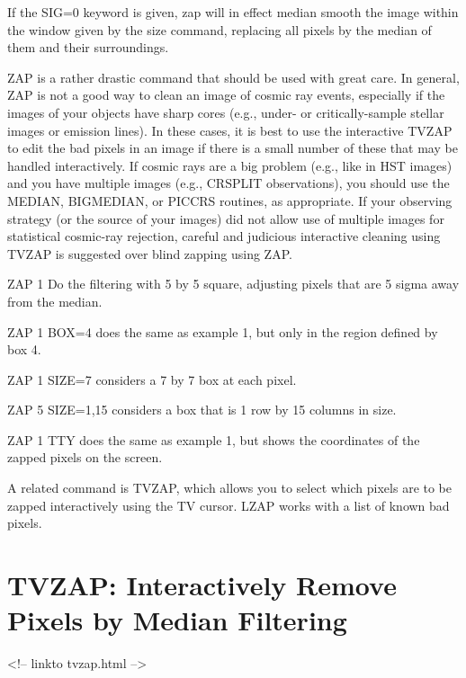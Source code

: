 If the SIG=0 keyword is given, zap will in effect median smooth the image
within the window given by the size command, replacing all pixels by the
median of them and their surroundings.

ZAP is a rather drastic command that should be used with great care.  In
general, ZAP is not a good way to clean an image of cosmic ray events,
especially if the images of your objects have sharp cores (e.g., under- or
critically-sample stellar images or emission lines).  In these cases, it is
best to use the interactive TVZAP to edit the bad pixels in an image if
there is a small number of these that may be handled interactively.  If
cosmic rays are a big problem (e.g., like in HST images) and you have
multiple images (e.g., CRSPLIT observations), you should use the MEDIAN,
BIGMEDIAN, or PICCRS routines, as appropriate.  If your observing strategy
(or the source of your images) did not allow use of multiple images for
statistical cosmic-ray rejection, careful and judicious interactive
cleaning using TVZAP is suggested over blind zapping using ZAP.

\begin{example}
  \item[ZAP 1\hfill]{Do the filtering with 5 by 5 square,
       adjusting pixels that are 5 sigma away from the median.}
  \item[ZAP 1 BOX=4\hfill]{does the same as example 1, but only in the
       region defined by box 4.}
  \item[ZAP 1 SIZE=7\hfill]{considers a 7 by 7 box at each pixel.}
  \item[ZAP 5 SIZE=1,15\hfill]{considers a box that is 1 row by 15 columns
       in size.}
  \item[ZAP 1 TTY\hfill]{does the same as example 1, but shows the
       coordinates of the zapped pixels on the screen.}
\end{example}

A related command is TVZAP, which allows you to select which pixels are to
be zapped interactively using the TV cursor.  LZAP works with a list of
known bad pixels.

\section{TVZAP: Interactively Remove Pixels by Median Filtering}
\begin{rawhtml}
<!-- linkto tvzap.html -->
\end{rawhtml}

